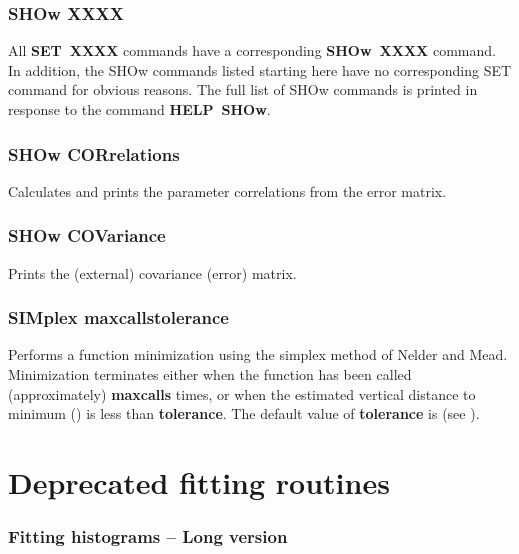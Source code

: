\subsubsection*{SHOw   XXXX}

All {\bf SET~XXXX} commands have a corresponding
{\bf SHOw~XXXX} command.
In addition, the SHOw commands listed starting here have no corresponding
SET command for obvious reasons.  The full list of SHOw commands
is printed in response to the command {\bf HELP~SHOw}.

\subsubsection*{SHOw CORrelations}

Calculates and prints the parameter correlations from the error matrix.

\subsubsection*{SHOw COVariance}

Prints the (external) covariance (error) matrix.

\subsubsection*{SIMplex  \lsb maxcalls\rsb   \lsb tolerance\rsb }

Performs a function minimization using the simplex method of Nelder and
Mead. Minimization terminates either when the function has been called
(approximately) {\bf \lsb maxcalls\rsb } times,
or when the estimated vertical
distance to minimum () is less than {\bf \lsb tolerance\rsb }.
The default value of {\bf \lsb tolerance\rsb } is
 (see ).

\newpage %

\section{Deprecated fitting routines}

\subsubsection*{Fitting histograms -- Long version}
 
 
